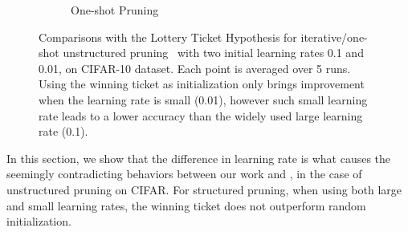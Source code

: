 \begin{figure}[!ht]
\begin{minipage}{0.96\textwidth}
\begin{subfigure}{\textwidth}
 \vspace{-2ex}
 \caption{One-shot Pruning}
 \label{iterative-3}
 \end{subfigure}
\end{minipage}
    \vspace{-1ex}
    \caption{
    Comparisons with the Lottery Ticket Hypothesis \citep{lottery} for iterative/one-shot unstructured  pruning~\citep{han2015learning} with two initial learning rates 0.1 and 0.01, on CIFAR-10 dataset. Each point is averaged over 5 runs. Using the winning ticket as initialization only brings improvement when the learning rate is small (0.01), however such small learning rate leads to a lower accuracy than the widely used large learning rate (0.1).}
    \label{lottery-figure-1}
\end{figure}



In this section, we show that the difference in learning rate is what causes the seemingly contradicting behaviors between our work and \citet{lottery}, in the case of unstructured pruning on CIFAR. For structured pruning, when using both large and small learning rates, the winning ticket does not outperform random initialization.



